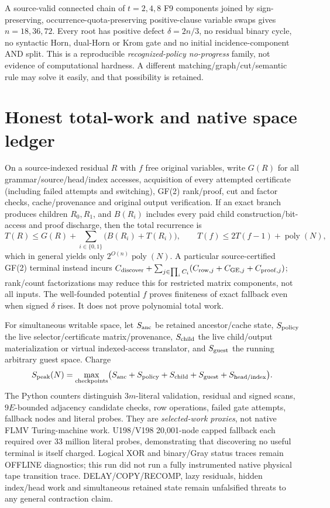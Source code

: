 \documentclass[11pt]{article}
\begin{document}
A source-valid connected chain of $t=2,4,8$ F9 components joined by sign-preserving, occurrence-quota-preserving positive-clause variable swaps gives $n=18,36,72$. Every root has positive defect $\delta=2n/3$, no residual binary cycle, no syntactic Horn, dual-Horn or Krom gate and no initial incidence-component AND split. This is a reproducible \emph{recognized-policy no-progress} family, not evidence of computational hardness. A different matching/graph/cut/semantic rule may solve it easily, and that possibility is retained.

\section{Honest total-work and native space ledger}
On a source-indexed residual $R$ with $f$ free original variables, write $G(R)$ for all grammar/source/head/index accesses, acquisition of every attempted certificate (including failed attempts and switching), GF(2) rank/proof, cut and factor checks, cache/provenance and original output verification. If an exact branch produces children $R_0,R_1$, and $B(R_i)$ includes every paid child construction/bit-access and proof discharge, then the total recurrence is
\[
T(R)\le G(R)+\sum_{i\in\{0,1\}}\bigl(B(R_i)+T(R_i)\bigr),
\qquad T(f)\le 2T(f-1)+\operatorname{poly}(N),
\]
which in general yields only $2^{O(n)}\operatorname{poly}(N)$. A particular source-certified GF(2) terminal instead incurs $C_{\rm discover}+\sum_{j\in\prod_i C_i}(C_{{\rm row},j}+C_{{\rm GE},j}+C_{{\rm proof},j})$; rank/count factorizations may reduce this for restricted matrix components, not all inputs. The well-founded potential $f$ proves finiteness of exact fallback even when signed $\delta$ rises. It does not prove polynomial total work.

For simultaneous writable space, let $S_{\rm anc}$ be retained ancestor/cache state, $S_{\rm policy}$ the live selector/certificate matrix/provenance, $S_{\rm child}$ the live child/output materialization or virtual indexed-access translator, and $S_{\rm guest}$ the running arbitrary guest space. Charge
\[
S_{\rm peak}(N)=\max_{\rm checkpoints}
\bigl(S_{\rm anc}+S_{\rm policy}+S_{\rm child}+S_{\rm guest}+S_{\rm head/index}\bigr).
\]
The Python counters distinguish $3m$-literal validation, residual and signed scans, $9E$-bounded adjacency candidate checks, row operations, failed gate attempts, fallback nodes and literal probes. They are \emph{selected-work proxies}, not native FLMV Turing-machine work. U198/V198 20,001-node capped fallback each required over 33 million literal probes, demonstrating that discovering no useful terminal is itself charged. Logical XOR and binary/Gray status traces remain OFFLINE diagnostics; this run did not run a fully instrumented native physical tape transition trace. DELAY/COPY/RECOMP, lazy residuals, hidden index/head work and simultaneous retained state remain unfalsified threats to any general contraction claim.
\end{document}
